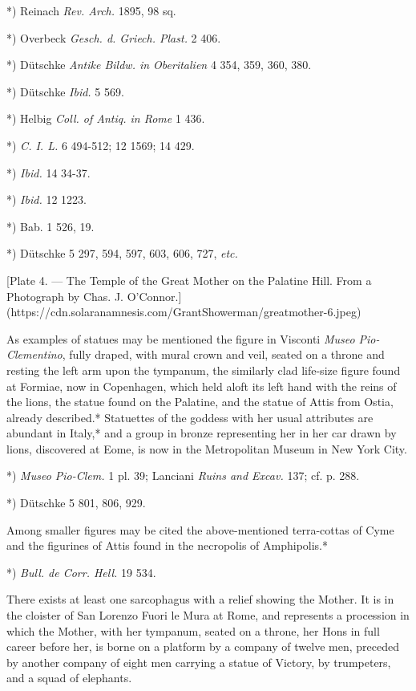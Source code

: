 \documentclass[a4paper, 11pt, oneside, polutonikogreek, english]{article}
\begin{document}
*) Reinach \emph{Rev. Arch.} 1895, 98 sq.

*) Overbeck \emph{Gesch. d. Griech. Plast.} 2 406.

*) Dütschke \emph{Antike Bildw. in Oberitalien} 4 354, 359, 360, 380.

*) Dütschke \emph{Ibid.} 5 569.

*) Helbig \emph{Coll. of Antiq. in Rome} 1 436.

*) \emph{C. I. L.} 6 494-512; 12 1569; 14 429.

*) \emph{Ibid.} 14 34-37.

*) \emph{Ibid.} 12 1223.

*) Bab. 1 526, 19.

*) Dütschke 5 297, 594, 597, 603, 606, 727, \emph{etc.}

[Plate 4. --- The Temple of the Great Mother on the Palatine Hill. From a Photograph by Chas. J. O'Connor.](https://cdn.solaranamnesis.com/GrantShowerman/greatmother-6.jpeg)

As examples of statues may be mentioned the figure in Visconti \emph{Museo Pio-Clementino}, fully draped, with mural crown and veil, seated on a throne and resting the left arm upon the tympanum, the similarly clad life-size figure found at Formiae, now in Copenhagen, which held aloft its left hand with the reins of the lions, the statue found on the Palatine, and the statue of Attis from Ostia, already described.* Statuettes of the goddess with her usual attributes are abundant in Italy,* and a group in bronze representing her in her car drawn by lions, discovered at Eome, is now in the Metropolitan Museum in New York City.

*) \emph{Museo Pio-Clem.} 1 pl. 39; Lanciani \emph{Ruins and Excav.} 137; cf. p. 288.

*) Dütschke 5 801, 806, 929.

Among smaller figures may be cited the above-mentioned terra-cottas of Cyme and the figurines of Attis found in the necropolis of Amphipolis.*

*) \emph{Bull. de Corr. Hell.} 19 534.

There exists at least one sarcophagus with a relief showing the Mother. It is in the cloister of San Lorenzo Fuori le Mura at Rome, and represents a procession in which the Mother, with her tympanum, seated on a throne, her Hons in full career before her, is borne on a platform by a company of twelve men, preceded by another company of eight men carrying a statue of Victory, by trumpeters, and a squad of elephants.
\end{document}
